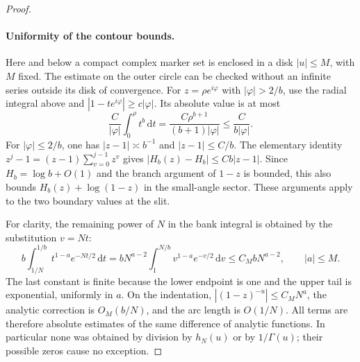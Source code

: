\documentclass[11pt]{article}
\theoremstyle{definition}\newtheorem{definition}[theorem]{Definition}
\theoremstyle{remark}\newtheorem{remark}[theorem]{Remark}
\newcommand{\dd}{\,\mathrm d}\newcommand{\ind}{\mathbf1}
\numberwithin{equation}{section}\allowdisplaybreaks
\begin{document}
\begin{proof}
\paragraph{Uniformity of the contour bounds.}
Here and below a compact complex marker set is enclosed in a disk
$|u|\le M$, with $M$ fixed. The estimate on the outer circle can be
checked without an infinite series outside its disk of convergence.
For $z=\rho e^{i\varphi}$ with $|\varphi|>2/b$, use the radial integral
above and $|1-te^{i\varphi}|\ge c|\varphi|$. Its absolute value is at most
\[
 \frac{C}{|\varphi|}\int_0^\rho t^b\dd t
 =\frac{C\rho^{b+1}}{(b+1)|\varphi|}
 \le \frac{C}{b|\varphi|}.
\]
For $|\varphi|\le2/b$, one has $|z-1|\asymp b^{-1}$ and
$|z-1|\le C/b$. The elementary identity
$z^j-1=(z-1)\sum_{v=0}^{j-1}z^v$ gives
$|H_b(z)-H_b|\le Cb|z-1|$. Since
$H_b=\log b+O(1)$ and the branch argument of $1-z$ is bounded, this
also bounds $H_b(z)+\log(1-z)$ in the small-angle sector.
These arguments apply to the two boundary values at the slit.

For clarity, the remaining power of $N$ in the bank integral is obtained
by the substitution $v=Nt$:
\[
 b\int_{1/N}^{1/b}t^{1-a}e^{-Nt/2}\dd t
 =bN^{a-2}\int_1^{N/b}v^{1-a}e^{-v/2}\dd v
 \le C_M bN^{a-2},\qquad |a|\le M.
\]
The last constant is finite because the lower endpoint is one and the
upper tail is exponential, uniformly in $a$. On the indentation,
$|(1-z)^{-u}|\le C_M N^a$, the analytic correction is $O_M(b/N)$,
and the arc length is $O(1/N)$. All terms are therefore absolute
estimates of the same difference of analytic functions. In particular
none was obtained by division by $h_N(u)$ or by $1/\Gamma(u)$; their
possible zeros cause no exception.

\end{proof}
\end{document}
